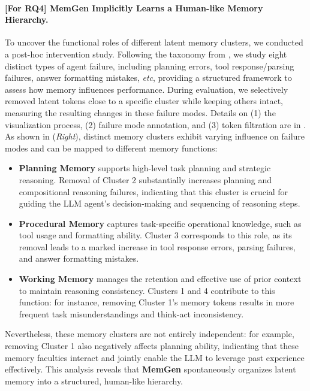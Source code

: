 \documentclass[]{fairmeta}
\newcommand{\ourmethod}{{\fontfamily{lmtt}\selectfont \textbf{MemGen}}\xspace}
\begin{document}
\vspace{-0.6em}
\paragraph{[For RQ4] \ourmethod Implicitly Learns a Human-like Memory Hierarchy.} To uncover the functional roles of different latent memory clusters, we conducted a post-hoc intervention study. Following the taxonomy from \citep{song2025failure-taxonomy}, we study eight distinct types of agent failure, including planning errors, tool response/parsing failures, answer formatting mistakes, \textit{etc}, providing a structured framework to assess how memory influences performance. During evaluation, we selectively removed latent tokens close to a specific cluster while keeping others intact, measuring the resulting changes in these failure modes.  Details on (1) the visualization process, (2) failure mode annotation, and (3) token filtration are in . 
As shown in  (\textit{Right}), distinct memory clusters exhibit varying influence on failure modes and can be mapped to different memory functions:
\vspace{-0.5em}
\begin{itemize}[leftmargin=*,itemsep=-0.1em]
    \item \textbf{Planning Memory} supports high-level task planning and strategic reasoning. Removal of Cluster 2 substantially increases planning and compositional reasoning failures, indicating that this cluster is crucial for guiding the LLM agent's decision-making and sequencing of reasoning steps.
    \item \textbf{Procedural Memory} captures task-specific operational knowledge, such as tool usage and formatting ability. Cluster 3 corresponds to this role, as its removal leads to a marked increase in tool response errors, parsing failures, and answer formatting mistakes.
    \item \textbf{Working Memory} manages the retention and effective use of prior context to maintain reasoning consistency. Clusters 1 and 4 contribute to this function: for instance, removing Cluster 1’s memory tokens results in more frequent task misunderstandings and think-act inconsistency.
\end{itemize}
\vspace{-0.5em}
Nevertheless, these memory clusters are not entirely independent: for example, removing Cluster 1 also negatively affects planning ability, indicating that these memory faculties interact and jointly enable the LLM to leverage past experience effectively. This analysis reveals that \ourmethod spontaneously organizes latent memory into a structured, human-like hierarchy.
\end{document}
